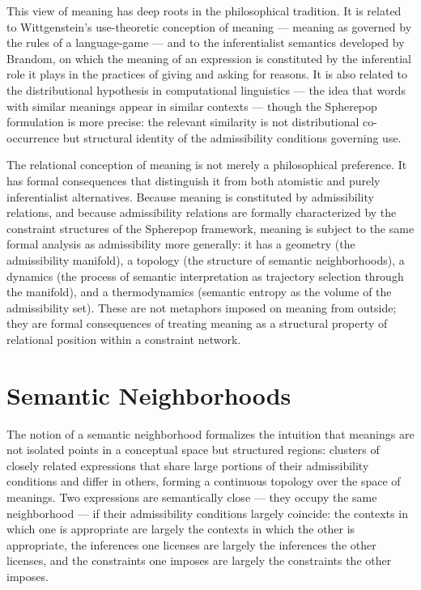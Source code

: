 \documentclass[12pt,openany]{book}
\theoremstyle{plain}
\theoremstyle{definition}
\theoremstyle{remark}
\begin{document}
This view of meaning has deep roots in the philosophical tradition. It is related to Wittgenstein's use-theoretic conception of meaning — meaning as governed by the rules of a language-game — and to the inferentialist semantics developed by Brandom, on which the meaning of an expression is constituted by the inferential role it plays in the practices of giving and asking for reasons. It is also related to the distributional hypothesis in computational linguistics — the idea that words with similar meanings appear in similar contexts — though the Spherepop formulation is more precise: the relevant similarity is not distributional co-occurrence but structural identity of the admissibility conditions governing use.

The relational conception of meaning is not merely a philosophical preference. It has formal consequences that distinguish it from both atomistic and purely inferentialist alternatives. Because meaning is constituted by admissibility relations, and because admissibility relations are formally characterized by the constraint structures of the Spherepop framework, meaning is subject to the same formal analysis as admissibility more generally: it has a geometry (the admissibility manifold), a topology (the structure of semantic neighborhoods), a dynamics (the process of semantic interpretation as trajectory selection through the manifold), and a thermodynamics (semantic entropy as the volume of the admissibility set). These are not metaphors imposed on meaning from outside; they are formal consequences of treating meaning as a structural property of relational position within a constraint network.

\section{Semantic Neighborhoods}

The notion of a semantic neighborhood formalizes the intuition that meanings are not isolated points in a conceptual space but structured regions: clusters of closely related expressions that share large portions of their admissibility conditions and differ in others, forming a continuous topology over the space of meanings. Two expressions are semantically close — they occupy the same neighborhood — if their admissibility conditions largely coincide: the contexts in which one is appropriate are largely the contexts in which the other is appropriate, the inferences one licenses are largely the inferences the other licenses, and the constraints one imposes are largely the constraints the other imposes.
\end{document}

